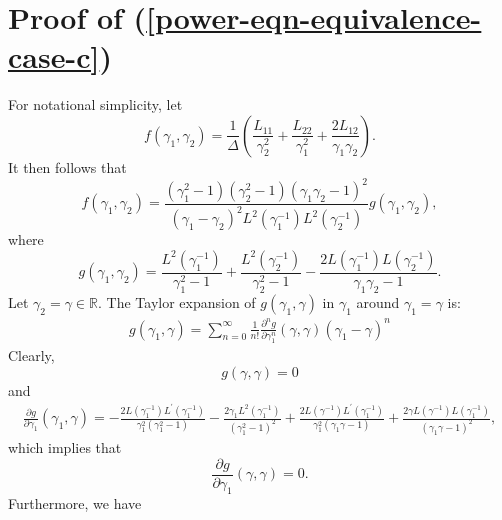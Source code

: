 \documentclass[12pt]{article}
\begin{document}
\section{Proof of (\ref{power-eqn-equivalence-case-c})}\label{sec:proof_of_ref_power_eqn_equivalence_case_c}
For notational simplicity, let 
\[
   f(\gamma_1,\gamma_2)= \frac{1}{\Delta}\left(\frac{L_{11}}{\gamma_2^2} + \frac{L_{22}}{\gamma_1^2} + \frac{2L_{12}}{\gamma_1\gamma_2}\right).
\]
It then follows that 
\begin{equation}\label{f}
   f(\gamma_1,\gamma_2) = \frac{(\gamma_1^2-1)(\gamma_2^2-1)(\gamma_1\gamma_2-1)^2}{(\gamma_1 - \gamma_2)^2L^2(\gamma_1^{-1})L^2(\gamma_2^{-1})}g(\gamma_1,\gamma_2),
\end{equation}
where 
\[
   g(\gamma_1,\gamma_2)=\frac{L^2(\gamma_1^{-1})}{\gamma_1^2-1} + \frac{L^2(\gamma_2^{-1})}{\gamma_2^2-1}-\frac{2L(\gamma_1^{-1})L(\gamma_2^{-1})}{\gamma_1\gamma_2-1}.
\]
Let $\gamma_2 = \gamma \in \mathbb{R}$. The Taylor expansion of $g(\gamma_1, \gamma)$ in $\gamma_1$ around $\gamma_1 = \gamma$ is:
\begin{equation}\label{taylor-g}
   \begin{aligned}
      g(\gamma_1,\gamma)= \sum_{n=0}^\infty\frac{1}{n!}\frac{\partial^ng}{\partial\gamma_1^n}(\gamma,\gamma)(\gamma_1-\gamma)^n
   \end{aligned}
\end{equation}
Clearly,
\begin{equation}\label{g-0}
   g(\gamma,\gamma)=0
\end{equation}
and
\begin{equation*}
   \begin{aligned}
      \frac{\partial g}{\partial \gamma_1}(\gamma_1,\gamma)= -\frac{2L(\gamma_1^{-1})L^\prime(\gamma_1^{-1})}{\gamma_1^2(\gamma_1^2-1)} -\frac{2\gamma_1L^2(\gamma_1^{-1})}{(\gamma_1^2-1)^2} + \frac{2L(\gamma^{-1})L^\prime(\gamma_1^{-1})}{\gamma_1^2(\gamma_1\gamma-1)}+\frac{2\gamma L(\gamma^{-1})L(\gamma_1^{-1})}{(\gamma_1\gamma-1)^2},
   \end{aligned}
\end{equation*}
which implies that 
\begin{equation}\label{g-1}
   \frac{\partial g}{\partial \gamma_1}(\gamma,\gamma)=0.
\end{equation}
Furthermore, we have 
\end{document}
